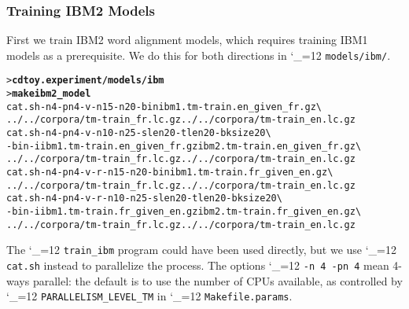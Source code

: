 \documentclass[11pt,letterpaper]{article}
\newcommand{\bs}{\textbackslash{}}
\newcommand{\TODO}[1]{\emph{\textbf{\textcolor{red}{<TODO> #1 </TODO>}}}}
\def\code{\begingroup\catcode`\_=12 \codex}
\newcommand{\codex}[1]{\texttt{#1}\endgroup}
\begin{document}

\subsubsection*{Training IBM2 Models}

First we train IBM2 word alignment models, which requires training IBM1 models
as a prerequisite.  We do this for both directions in \code{models/ibm/}.
\begin{small}
\begin{alltt}
   > \textbf{cd toy.experiment/models/ibm}
   > \textbf{make ibm2_model}
   cat.sh -n 4 -pn 4 -v -n1 5 -n2 0 -bin ibm1.tm-train.en_given_fr.gz \bs
      ../../corpora/tm-train_fr.lc.gz ../../corpora/tm-train_en.lc.gz
   cat.sh -n 4 -pn 4 -v -n1 0 -n2 5 -slen 20 -tlen 20 -bksize 20 \bs
      -bin -i ibm1.tm-train.en_given_fr.gz ibm2.tm-train.en_given_fr.gz \bs
      ../../corpora/tm-train_fr.lc.gz ../../corpora/tm-train_en.lc.gz
   cat.sh -n 4 -pn 4 -v -r -n1 5 -n2 0 -bin ibm1.tm-train.fr_given_en.gz \bs
      ../../corpora/tm-train_fr.lc.gz ../../corpora/tm-train_en.lc.gz
   cat.sh -n 4 -pn 4 -v -r -n1 0 -n2 5 -slen 20 -tlen 20 -bksize 20 \bs
      -bin -i ibm1.tm-train.fr_given_en.gz ibm2.tm-train.fr_given_en.gz \bs
      ../../corpora/tm-train_fr.lc.gz ../../corpora/tm-train_en.lc.gz
\end{alltt}
\end{small}
The \code{train_ibm} program could have been used directly, but we use
\code{cat.sh} instead to parallelize the process. The
options \code{-n 4 -pn 4} mean 4-ways parallel: the default is to use the
number of CPUs available, as controlled by \code{PARALLELISM_LEVEL_TM}
in \code{Makefile.params}.
\end{document}
